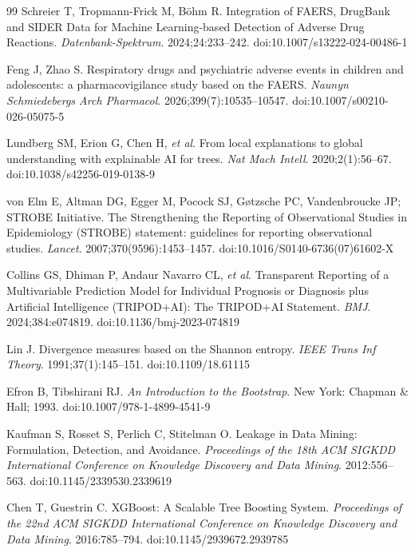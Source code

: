 \documentclass[10pt]{article}
\begin{document}
\begin{thebibliography}{99}
Schreier T, Tropmann-Frick M, B\"{o}hm R.
Integration of FAERS, DrugBank and SIDER Data for Machine Learning-based Detection of Adverse Drug Reactions.
\textit{Datenbank-Spektrum}. 2024;24:233--242.
doi:10.1007/s13222-024-00486-1
 
Feng J, Zhao S.
Respiratory drugs and psychiatric adverse events in children and adolescents: a pharmacovigilance study based on the FAERS.
\textit{Naunyn Schmiedebergs Arch Pharmacol}. 2026;399(7):10535--10547.
doi:10.1007/s00210-026-05075-5
 
Lundberg SM, Erion G, Chen H, \textit{et al}.
From local explanations to global understanding with explainable AI for trees.
\textit{Nat Mach Intell}. 2020;2(1):56--67.
doi:10.1038/s42256-019-0138-9
 
von Elm E, Altman DG, Egger M, Pocock SJ, G{\o}tzsche PC, Vandenbroucke JP; STROBE Initiative.
The Strengthening the Reporting of Observational Studies in Epidemiology (STROBE) statement: guidelines for reporting observational studies.
\textit{Lancet}. 2007;370(9596):1453--1457.
doi:10.1016/S0140-6736(07)61602-X
 
Collins GS, Dhiman P, Andaur Navarro CL, \textit{et al}.
Transparent Reporting of a Multivariable Prediction Model for Individual Prognosis or Diagnosis plus Artificial Intelligence (TRIPOD+AI): The TRIPOD+AI Statement.
\textit{BMJ}. 2024;384:e074819.
doi:10.1136/bmj-2023-074819

Lin J.
Divergence measures based on the Shannon entropy.
\textit{IEEE Trans Inf Theory}. 1991;37(1):145--151.
doi:10.1109/18.61115
 
Efron B, Tibshirani RJ.
\textit{An Introduction to the Bootstrap}. New York: Chapman \& Hall; 1993.
doi:10.1007/978-1-4899-4541-9
 
Kaufman S, Rosset S, Perlich C, Stitelman O.
Leakage in Data Mining: Formulation, Detection, and Avoidance.
\textit{Proceedings of the 18th ACM SIGKDD International Conference on Knowledge Discovery and Data Mining}. 2012:556--563.
doi:10.1145/2339530.2339619
 
Chen T, Guestrin C.
XGBoost: A Scalable Tree Boosting System.
\textit{Proceedings of the 22nd ACM SIGKDD International Conference on Knowledge Discovery and Data Mining}. 2016:785--794.
doi:10.1145/2939672.2939785
 
\end{thebibliography}
\end{document}
